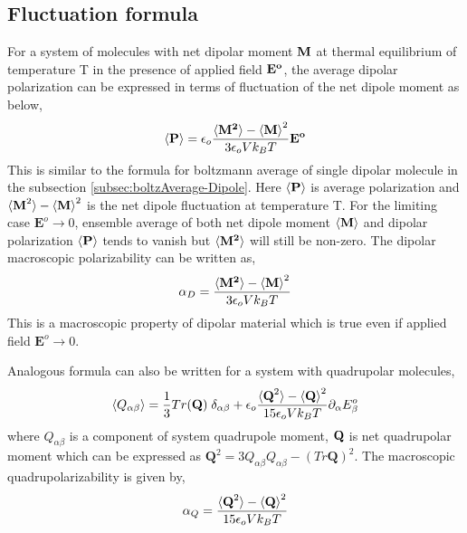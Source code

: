 \subsection{Fluctuation formula}
\label{subsec:fluctuation}
For a system of molecules with net dipolar moment $\bf{M}$ at thermal equilibrium of temperature T in the presence of applied field $\bf{E}^o$, the average dipolar polarization can be expressed in terms of fluctuation of the net dipole moment as below,\cite{Stern03}
\begin{equation}
\braket{\bf{P}} = \epsilon_o \frac{\braket{\bf{M}^2}-{\braket{\bf{M}}}^2}{3 \epsilon_o V k_B T}\bf{E}^o
\label{flucDipole}
\end{equation}
This is similar to the formula for boltzmann average of single dipolar molecule in the subsection \ref{subsec:boltzAverage-Dipole}. Here $\braket{\bf{P}}$ is average polarization and $ \braket{\textbf{M}^2}-{\braket{\textbf{M}}}^2$ is the net dipole fluctuation at temperature T. For the limiting case $\textbf{E}^o \rightarrow 0 $, ensemble average of both net dipole moment $\braket{\textbf{M}}$ and dipolar polarization $\braket{\bf{P}}$ tends to vanish but $\braket{\bf{M}^2}$ will still be non-zero. The dipolar macroscopic polarizability can be written as,
\begin{equation}
\alpha_D = \frac{\braket{\bf{M}^2}-{\braket{\bf{M}}}^2}{3 \epsilon_o V k_B T}
\end{equation}
This is a macroscopic property of dipolar material which is true even if applied field $ \textbf{E}^o \rightarrow 0 $.  

Analogous formula can also be written for a system with quadrupolar molecules,
\begin{equation}
\braket{Q_{\alpha\beta}} = \frac{1}{3} Tr(\textbf{Q})\; \delta_{\alpha\beta} + \epsilon_o \frac{\braket{\textbf{Q}^2}-{\braket{\textbf{Q}}}^2}{15 \epsilon_o V k_B T}{\partial_\alpha E^o_\beta}
\label{flucQuad}
\end{equation}
where $Q_{\alpha\beta}$ is a component of system quadrupole moment,  $\bf{Q}$ is net quadrupolar moment which can be expressed as $\textbf{Q}^2 =3Q_{\alpha\beta}Q_{\alpha\beta}-(Tr\textbf{Q})^2 $. The macroscopic quadrupolarizability is given by,
\begin{equation}
\alpha_Q = \frac{\braket{\textbf{Q}^2}-{\braket{\textbf{Q}}}^2}{15 \epsilon_o V k_B T}
\label{propConstQuad}
\end{equation}

